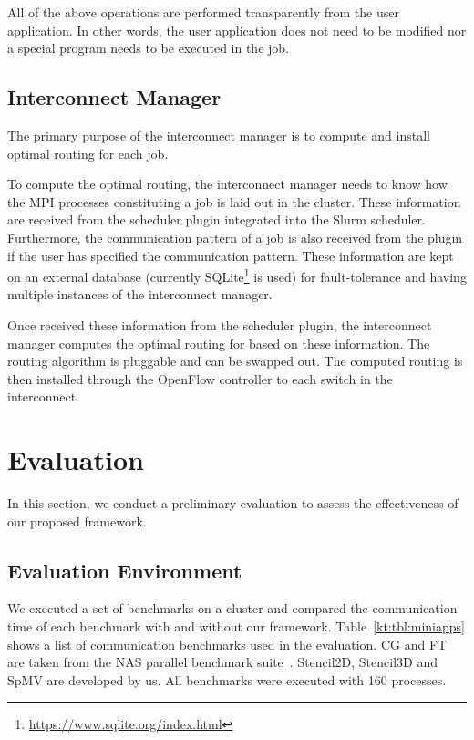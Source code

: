 \documentclass[graybox]{svmult}
\begin{document}
All of the above operations are performed transparently from the user
application. In other words, the user application does not need to be modified
nor a special program needs to be executed in the job.

\subsection{Interconnect Manager}

The primary purpose of the interconnect manager is to compute and install
optimal routing for each job.

To compute the optimal routing, the interconnect manager needs to know how
the MPI processes constituting a job is laid out in the cluster. These
information are received from the scheduler plugin integrated into the Slurm
scheduler. Furthermore, the communication pattern of a job is also received
from the plugin if the user has specified the communication pattern. These
information are kept on an external database (currently
SQLite\footnote{\url{https://www.sqlite.org/index.html}} is used) for
fault-tolerance and having multiple instances of the interconnect manager.

Once received these information from the scheduler plugin, the interconnect
manager computes the optimal routing for based on these information.
The routing algorithm is pluggable and can be swapped out. The computed
routing is then installed through the OpenFlow controller to each switch in
the interconnect.

\section{Evaluation}\label{kt:sec:iv}

In this section, we conduct a preliminary evaluation to assess the
effectiveness of our proposed framework.

\subsection{Evaluation Environment}

We executed a set of benchmarks on a cluster and compared the communication
time of each benchmark with and without our framework.
Table~\ref{kt:tbl:miniapps} shows a list of communication benchmarks used in
the evaluation. CG and FT are taken from the NAS parallel benchmark
suite~\cite{Bailey1991}. Stencil2D, Stencil3D and SpMV are developed by us.
All benchmarks were executed with 160 processes.
\end{document}
